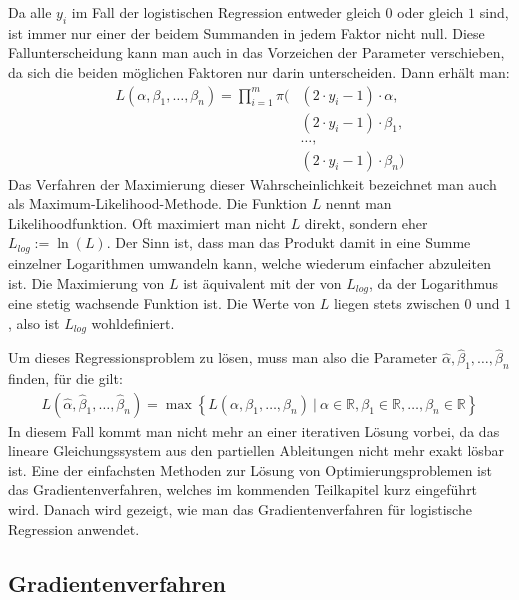 Da alle $y_i$ im Fall der logistischen Regression entweder gleich $0$ oder gleich $1$ sind, ist immer nur einer der beidem Summanden in jedem Faktor nicht null. Diese Fallunterscheidung kann man auch in das Vorzeichen der Parameter verschieben, da sich die beiden möglichen Faktoren nur darin unterscheiden. Dann erhält man:
\begin{align*}
    L(\alpha, \beta_1, \dots, \beta_n) = \prod_{i=1}^m \pi(&(2 \cdot y_i - 1) \cdot \alpha, \\
    &(2 \cdot y_i - 1) \cdot \beta_1, \\
    &\dots, \\
    &(2 \cdot y_i - 1) \cdot \beta_n)
\end{align*}
Das Verfahren der Maximierung dieser Wahrscheinlichkeit bezeichnet man auch als Maximum-Likelihood-Methode. Die Funktion $L$ nennt man Likelihoodfunktion. Oft maximiert man nicht $L$ direkt, sondern eher $L_{log} := \ln(L)$. Der Sinn ist, dass man das Produkt damit in eine Summe einzelner Logarithmen umwandeln kann, welche wiederum einfacher abzuleiten ist. Die Maximierung von $L$ ist äquivalent mit der von $L_{log}$, da der Logarithmus eine stetig wachsende Funktion ist. Die Werte von $L$ liegen stets zwischen $0$ und $1$, also ist $L_{log}$ wohldefiniert.

Um dieses Regressionsproblem zu lösen, muss man also die Parameter $\hat\alpha, \hat\beta_1, \dots, \hat\beta_n$ finden, für die gilt:
\begin{align*}
    L(\hat\alpha, \hat\beta_1, \dots, \hat\beta_n) = \max \left\{ L(\alpha, \beta_1, \dots, \beta_n) ~|~ \alpha \in \mathbb{R}, \beta_1 \in \mathbb{R}, \dots, \beta_n \in \mathbb{R} \right\}
\end{align*}
In diesem Fall kommt man nicht mehr an einer iterativen Lösung vorbei, da das lineare Gleichungssystem aus den partiellen Ableitungen nicht mehr exakt lösbar ist. Eine der einfachsten Methoden zur Lösung von Optimierungsproblemen ist das Gradientenverfahren, welches im kommenden Teilkapitel kurz eingeführt wird. Danach wird gezeigt, wie man das Gradientenverfahren für logistische Regression anwendet.

\subsection{Gradientenverfahren}
\label{subsection:2:2:1}

